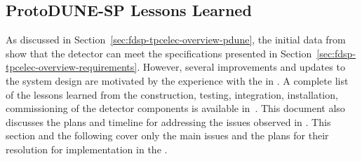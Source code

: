 \subsection{ProtoDUNE-SP Lessons Learned}
\label{sec:fdsp-tpcelec-overview-lessons}

As discussed in %
Section~\ref{sec:fdsp-tpcelec-overview-pdune}, the initial data from 
show that the  detector can meet the  %
specifications presented in 
Section~\ref{sec:fdsp-tpcelec-overview-requirements}. %
However, several improvements and updates to the  system design 
are motivated by the experience with the  in . 
A complete list of the lessons learned from the construction, testing, integration,
installation, commissioning of the  detector components
is available in~\cite{bib:docdb12367}. This document also discusses %
the plans and timeline for addressing the issues 
observed in . %
This section and the following cover only the main issues  %
and the plans for their resolution  
for implementation in the . %

